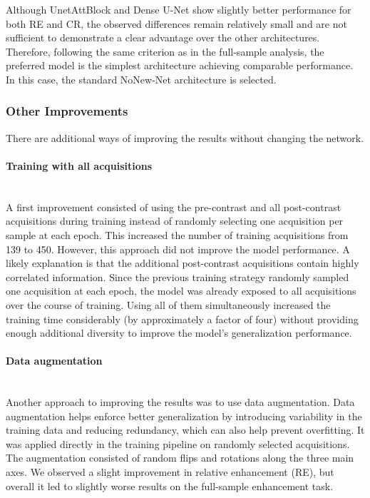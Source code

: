 \documentclass[12pt]{article}
\begin{document}
Although UnetAttBlock and Dense U-Net show slightly better performance for both RE and CR, the observed differences remain relatively small and are not sufficient to demonstrate a clear advantage over the other architectures.
Therefore, following the same criterion as in the full-sample analysis, the preferred model is the simplest architecture achieving comparable performance. 
In this case, the standard NoNew-Net architecture is selected.

\subsubsection{Other Improvements} 

There are additional ways of improving the results without changing the network.

\paragraph{Training with all acquisitions}
\mbox{}\\

A first improvement consisted of using the pre-contrast and all post-contrast acquisitions during training instead of randomly selecting one acquisition per sample at each epoch.
This increased the number of training acquisitions from 139 to 450. 
However, this approach did not improve the model performance. 
A likely explanation is that the additional post-contrast acquisitions contain highly correlated information.
Since the previous training strategy randomly sampled one acquisition at each epoch, the model was already exposed to all acquisitions over the course of training.
Using all of them simultaneously increased the training time considerably (by approximately a factor of four) without providing enough additional diversity to improve the model's generalization performance.

\paragraph{Data augmentation}
\mbox{}\\

Another approach to improving the results was to use data augmentation. Data augmentation helps enforce better generalization by introducing variability in the training data and reducing redundancy, which can also help prevent overfitting.
It was applied directly in the training pipeline on randomly selected acquisitions. 
The augmentation consisted of random flips and rotations along the three main axes.
We observed a slight improvement in relative enhancement (RE), but overall it led to slightly worse results on the full-sample enhancement task.
\end{document}
